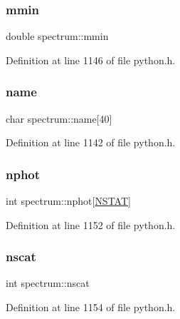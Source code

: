 \subsubsection{\texorpdfstring{mmin}{mmin}}
{\footnotesize\ttfamily double spectrum\+::mmin}



Definition at line 1146 of file python.\+h.

\mbox{\label{structspectrum_a86749b492b0d4a2ab83c696c316e0fbc}} 
\subsubsection{\texorpdfstring{name}{name}}
{\footnotesize\ttfamily char spectrum\+::name\mbox{[}40\mbox{]}}



Definition at line 1142 of file python.\+h.

\mbox{\label{structspectrum_ac9328e98ffae503d8f0ce5ba8379a016}} 
\subsubsection{\texorpdfstring{nphot}{nphot}}
{\footnotesize\ttfamily int spectrum\+::nphot\mbox{[}\hyperlink{python_8h_a4a9a1642d81917a657708ea18c9c075c}{N\+S\+T\+AT}\mbox{]}}



Definition at line 1152 of file python.\+h.

\mbox{\label{structspectrum_a04d2a8c73e62086593a49f14eedac9b2}} 
\subsubsection{\texorpdfstring{nscat}{nscat}}
{\footnotesize\ttfamily int spectrum\+::nscat}



Definition at line 1154 of file python.\+h.

\mbox{\label{structspectrum_a9903de0f564e82023d6c000c1cc6c208}} 
